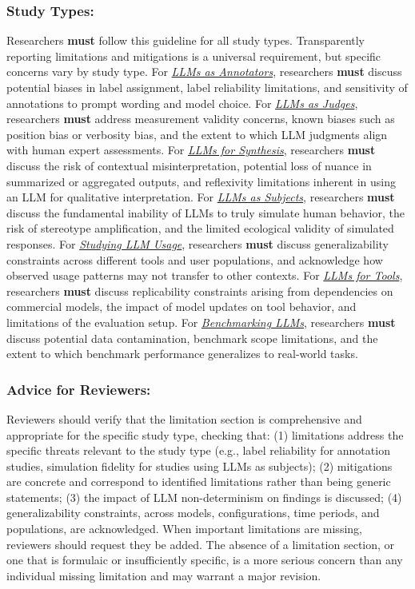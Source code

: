 \documentclass[smallextended]{svjour3}
\newcommand{\must}{\textbf{must}\xspace}
\newcommand{\annotators}{\hyperref[sec:llms-as-annotators]{\emph{LLMs as Annotators}}\xspace}
\newcommand{\judges}{\hyperref[sec:llms-as-judges]{\emph{LLMs as Judges}}\xspace}
\newcommand{\synthesis}{\hyperref[sec:llms-for-synthesis]{\emph{LLMs for Synthesis}}\xspace}
\newcommand{\subjects}{\hyperref[sec:llms-as-subjects]{\emph{LLMs as Subjects}}\xspace}
\newcommand{\llmusage}{\hyperref[sec:studying-llm-usage-in-software-engineering]{\emph{Studying LLM Usage}}\xspace}
\newcommand{\newtools}{\hyperref[sec:llms-for-new-software-engineering-tools]{\emph{LLMs for Tools}}\xspace}
\newcommand{\benchmarkingtasks}{\hyperref[sec:benchmarking-llms-for-software-engineering-tasks]{\emph{Benchmarking LLMs}}\xspace}
\newcommand{\annotators}{\href{/study-types\#llms-as-annotators}{\emph{LLMs as Annotators}}\xspace}
\newcommand{\judges}{\href{/study-types\#llms-as-judges}{\emph{LLMs as Judges}}\xspace}
\newcommand{\synthesis}{\href{/study-types\#llms-for-synthesis}{\emph{LLMs for Synthesis}}\xspace}
\newcommand{\subjects}{\href{/study-types\#llms-as-subjects}{\emph{LLMs as Subjects}}\xspace}
\newcommand{\llmusage}{\href{/study-types\#studying-llm-usage-in-software-engineering}{\emph{Studying LLM Usage}}\xspace}
\newcommand{\newtools}{\href{/study-types\#llms-for-new-software-engineering-tools}{\emph{LLMs for Tools}}\xspace}
\newcommand{\benchmarkingtasks}{\href{/study-types\#benchmarking-llms-for-software-engineering-tasks}{\emph{Benchmarking LLMs}}\xspace}
\newcommand{\guidelinesubsubsection}[1]{\subsubsection{\bfseries #1:}}
\newcommand{\guidelinesubsubsection}[1]{\subsubsection{#1}}
\begin{document}
\guidelinesubsubsection{Study Types}

Researchers \must follow this guideline for all study types. Transparently reporting limitations and mitigations is a universal requirement, but specific concerns vary by study type.
For \annotators, researchers \must discuss potential biases in label assignment, label reliability limitations, and sensitivity of annotations to prompt wording and model choice.
For \judges, researchers \must address measurement validity concerns, known biases such as position bias or verbosity bias, and the extent to which LLM judgments align with human expert assessments.
For \synthesis, researchers \must discuss the risk of contextual misinterpretation, potential loss of nuance in summarized or aggregated outputs, and reflexivity limitations inherent in using an LLM for qualitative interpretation.
For \subjects, researchers \must discuss the fundamental inability of LLMs to truly simulate human behavior, the risk of stereotype amplification, and the limited ecological validity of simulated responses.
For \llmusage, researchers \must discuss generalizability constraints across different tools and user populations, and acknowledge how observed usage patterns may not transfer to other contexts.
For \newtools, researchers \must discuss replicability constraints arising from dependencies on commercial models, the impact of model updates on tool behavior, and limitations of the evaluation setup.
For \benchmarkingtasks, researchers \must discuss potential data contamination, benchmark scope limitations, and the extent to which benchmark performance generalizes to real-world tasks.

\guidelinesubsubsection{Advice for Reviewers}

Reviewers should verify that the limitation section is comprehensive and appropriate for the specific study type, checking that:
(1) limitations address the specific threats relevant to the study type (e.g., label reliability for annotation studies, simulation fidelity for studies using LLMs as subjects);
(2) mitigations are concrete and correspond to identified limitations rather than being generic statements;
(3) the impact of LLM non-determinism on findings is discussed;
(4) generalizability constraints, across models, configurations, time periods, and populations, are acknowledged.
When important limitations are missing, reviewers should request they be added. The absence of a limitation section, or one that is formulaic or insufficiently specific, is a more serious concern than any individual missing limitation and may warrant a major revision.
\end{document}
